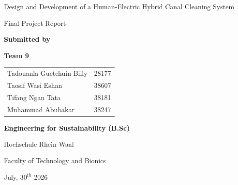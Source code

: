 \begin{titlepage}
    \centering

    \vspace*{2cm}

    {\Huge
    Design and Development of a Human-Electric Hybrid Canal Cleaning System
    \par}

    \vspace{2cm}

    {\Large
    Final Project Report
    \par}

    \vspace{3cm}

    \textbf{Submitted by}

    \vspace{0.1cm}

    \textbf{Team 9}

    \vspace{0.5cm}

    \begin{tabular}{ll}
    Tadouanla Guetchuin Billy & 28177\\
    Taosif Wasi Eshan & 38607\\
    Tifang Ngan Tata            & 38181  \\
    Muhammad Abubakar           & 38247 \\
    \end{tabular}

    \vfill

   {\bfseries Engineering for Sustainability (B.Sc) }
    \vspace{1cm}

    Hochschule Rhein-Waal

    Faculty of Technology and Bionics

    \vspace{0.5cm}

    July, 30$^{th}$ 2026

\end{titlepage}
